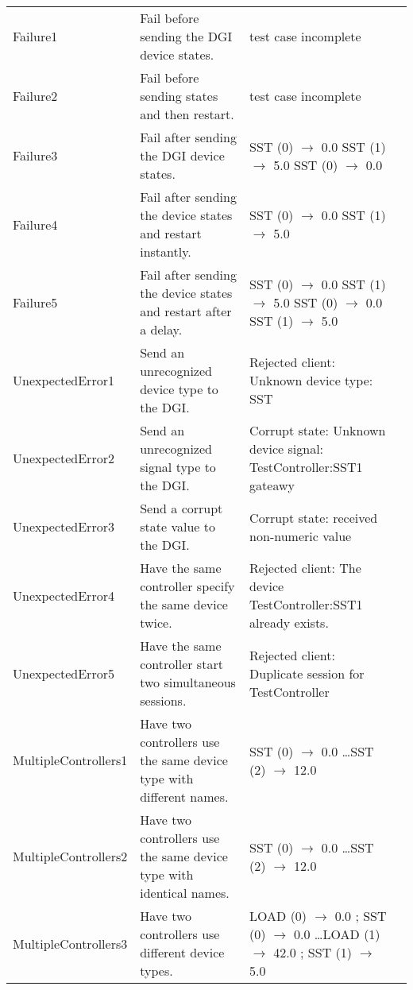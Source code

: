 \documentclass{article}
\begin{document}
\begin{center}
\begin{footnotesize}
\begin{longtable}{|p{3cm}|p{4cm}|p{10cm}|c|}
    Failure1 & Fail before sending the DGI device states. & test case incomplete & \\
    Failure2 & Fail before sending states and then restart. & test case incomplete & \\
    Failure3 & Fail after sending the DGI device states. & SST (0) $\rightarrow$ 0.0 \newline SST (1) $\rightarrow$ 5.0 \newline SST (0) $\rightarrow$ 0.0 & \\
    Failure4 & Fail after sending the device states and restart instantly. & SST (0) $\rightarrow$ 0.0 \newline SST (1) $\rightarrow$ 5.0 & \\
    Failure5 & Fail after sending the device states and restart after a delay. & SST (0) $\rightarrow$ 0.0 \newline SST (1) $\rightarrow$ 5.0 \newline SST (0) $\rightarrow$ 0.0 \newline SST (1) $\rightarrow$ 5.0 & \\
    UnexpectedError1 & Send an unrecognized device type to the DGI. & Rejected client: Unknown device type: SST & \\
    UnexpectedError2 & Send an unrecognized signal type to the DGI. & Corrupt state: Unknown device signal: TestController:SST1 gateawy & \\
    UnexpectedError3 & Send a corrupt state value to the DGI. & Corrupt state: received non-numeric value & \\
    UnexpectedError4 & Have the same controller specify the same device twice. & Rejected client: The device TestController:SST1 already exists. & \\
    UnexpectedError5 & Have the same controller start two simultaneous sessions. & Rejected client: Duplicate session for TestController & \\
    MultipleControllers1 & Have two controllers use the same device type with different names. & SST (0) $\rightarrow$ 0.0 \newline \ldots \newline SST (2) $\rightarrow$ 12.0 & \\
    MultipleControllers2 & Have two controllers use the same device type with identical names. & SST (0) $\rightarrow$ 0.0 \newline \ldots \newline SST (2) $\rightarrow$ 12.0 & \\
    MultipleControllers3 & Have two controllers use different device types. & LOAD (0) $\rightarrow$ 0.0 ; SST (0) $\rightarrow$ 0.0 \newline \ldots \newline LOAD (1) $\rightarrow$ 42.0 ; SST (1) $\rightarrow$ 5.0 & \\

\end{longtable}
\end{footnotesize}
\end{center}
\end{document}
